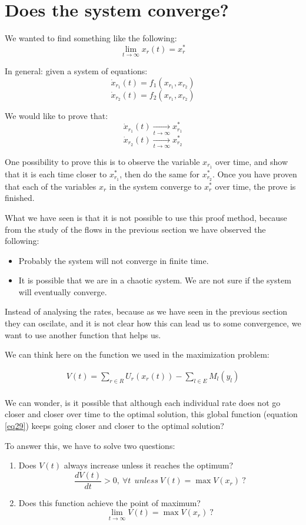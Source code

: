 \section{Does the system converge?}
We wanted to find something like the following:
$$\lim_{t\to\infty} x_r(t) = x^*_r$$

In general: given a system of equations:
$$\dot{x}_{r_1}(t) = f_1(x_{r_1}, x_{r_2})$$
$$\dot{x}_{r_2}(t) = f_2(x_{r_1}, x_{r_2})$$

We would like to prove that:
$$\dot{x}_{r_1}(t) \xrightarrow[t\to\infty]{} x^*_{r_1}$$
$$\dot{x}_{r_2}(t) \xrightarrow[t\to\infty]{} x^*_{r_2}$$

One possibility to prove this is to observe the variable $x_{r_1}$ over time, and show that it is each time closer to $x^*_{r_1}$, then do the same for $x^*_{r_2}$. Once you have proven that each of the variables $x_{r}$ in the system converge to $x^*_{r}$ over time, the prove is finished.

What we have seen is that it is not possible to use this proof method, because from the study of the flows in the previous section we have observed the following:
\begin{itemize}
\item Probably the system will not converge in finite time.
\item It is possible that we are in a chaotic system. We are not sure if the system will eventually converge.
\end{itemize}

Instead of analysing the rates, because as we have seen in the previous section they can oscilate, and it is not clear how this can lead us to some convergence, we want to use another function that helps us.

We can think here on the function we used in the maximization problem:

\begin{equation}
\begin{aligned}
V(t) = \sum_{r \in R} U_{r}(x_{r}(t))- \sum_{l \in E} M_{l}(y_{l})\\
\end{aligned}
\label{eq29}
\end{equation}

We can wonder, is it possible that although each individual rate does not go closer and closer over time to the optimal solution, this global function (equation \eqref{eq29}) keeps going closer and closer to the optimal solution? 

To answer this, we have to solve two questions:
\begin{enumerate}
\item Does $V(t)$ always increase unless it reaches the optimum?
$$\frac{dV(t)}{dt} > 0,\ \forall t \ \ unless \  V(t) = \max V(x_r) \ ?$$
\item Does this function achieve the point of maximum?
$$\lim_{t\to\infty} V(t) = \max V(x_r) \ ?$$
\end{enumerate}

